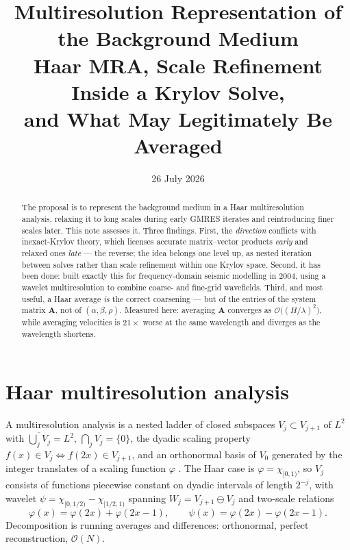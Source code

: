 \documentclass[11pt,a4paper]{article}
\title{\bfseries Multiresolution Representation of the Background Medium\\[4pt]
\large Haar MRA, Scale Refinement Inside a Krylov Solve,\\
and What May Legitimately Be Averaged}
\author{}
\date{26 July 2026}
\newcommand{\bA}{\mathbf{A}}
\begin{document}
\maketitle

\begin{abstract}
\noindent
The proposal is to represent the background medium in a Haar multiresolution
analysis, relaxing it to long scales during early GMRES iterates and
reintroducing finer scales later.  This note assesses it.  Three findings.
First, the \emph{direction} conflicts with inexact-Krylov theory, which
licenses accurate matrix--vector products \emph{early} and relaxed ones
\emph{late} --- the reverse; the idea belongs one level up, as nested
iteration between solves rather than scale refinement within one Krylov space.
Second, it has been done: \citet{hustedt2004} built exactly this for
frequency-domain seismic modelling in 2004, using a wavelet multiresolution to
combine coarse- and fine-grid wavefields.  Third, and most useful, a Haar
average \emph{is} the correct coarsening --- but of the entries of the system
matrix $\bA$, not of $(\alpha,\beta,\rho)$.  Measured here: averaging $\bA$
converges as $\mathcal{O}\bigl((H/\lambda)^2\bigr)$, while averaging velocities
is $21\times$ worse at the same wavelength and diverges as the wavelength
shortens.
\end{abstract}

\tableofcontents

\section{Haar multiresolution analysis}

A multiresolution analysis is a nested ladder of closed subspaces
$V_j \subset V_{j+1}$ of $L^2$ with $\overline{\bigcup_j V_j} = L^2$,
$\bigcap_j V_j = \{0\}$, the dyadic scaling property
$f(x)\in V_j \Leftrightarrow f(2x)\in V_{j+1}$, and an orthonormal basis of
$V_0$ generated by the integer translates of a scaling function $\varphi$
\citep{mallat1989,daubechies1992}.  The Haar case is
$\varphi = \chi_{[0,1)}$, so $V_j$ consists of functions piecewise constant on
dyadic intervals of length $2^{-j}$, with wavelet
$\psi = \chi_{[0,1/2)} - \chi_{[1/2,1)}$ spanning
$W_j = V_{j+1}\ominus V_j$ and two-scale relations
\begin{equation}\label{eq:refine}
  \varphi(x) = \varphi(2x) + \varphi(2x-1),
  \qquad
  \psi(x) = \varphi(2x) - \varphi(2x-1).
\end{equation}
Decomposition is running averages and differences: orthonormal, perfect
reconstruction, $\mathcal{O}(N)$.
\end{document}
